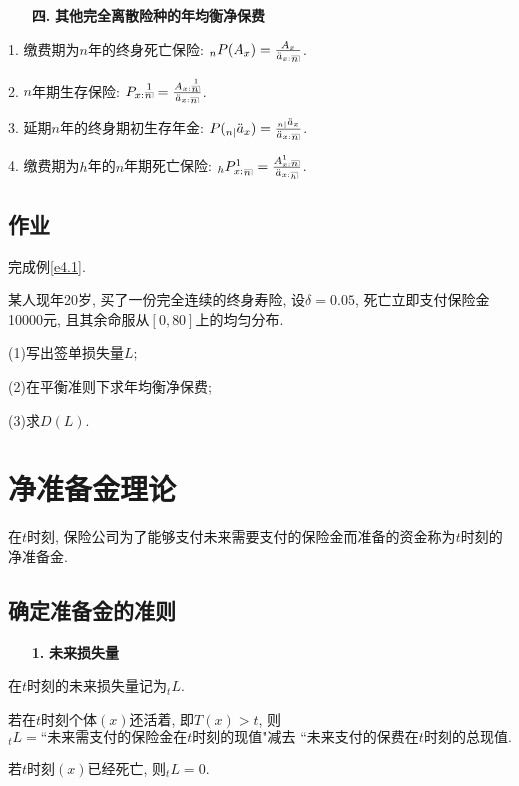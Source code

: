 \documentclass[a4paper,openany, 10pt]{ctexbook}
\makeatletter
\newcommand{\hei}{\CJKfamily{hei}}      %
\DeclareRobustCommand{\annu}[1]{_{%
    \def\arraystretch{0}%
    \setlength\arraycolsep{1pt}%
    \setlength\arrayrulewidth{.2pt}%
    \begin{array}[b]{@{}c|}\hline
        \\[\arraycolsep]%
        \scriptstyle #1%
    \end{array}%
}}
\makeatother
\begin{document}
\begin{itemize}
    \item[{\bf\hei 四.}]{\bf\hei 其他完全离散险种的年均衡净保费}
\end{itemize}

1. 缴费期为$n$年的终身死亡保险:
${}_{n}P(A_{x})=\frac{A_{x}}{\ddot{a}_{x:}{}\annu n}$.

2. $n$年期生存保险:
$P_{x:}\overset{1}{{}\annu n}=\frac{A_{x:}\overset{1}{{}\annu n}}{\ddot a_{x:}{}\annu n}$.

3. 延期$n$年的终身期初生存年金:
$P({}_{n|}\ddot a_{x})=\frac{{}_{n|}\ddot a_{x}}{\ddot{a}_{x:}{}\annu n}$.

4. 缴费期为$h$年的$n$年期死亡保险:
${}_{h}P^{1}_{x:}{}_{\annu n}=\frac{A^{1}_{x:}{}\annu n}{\ddot a_{x:}{}{\scriptsize \annu h}}$.

\section{作业}
\begin{exs}
    完成例\ref{e4.1}.
\end{exs}
\begin{exs}
   某人现年20岁, 买了一份完全连续的终身寿险, 设$\delta=0.05$, 死亡立即支付保险金10000元, 且其余命服从$[0,80]$上的均匀分布.

   (1)写出签单损失量$L;$

   (2)在平衡准则下求年均衡净保费;

   (3)求$D(L).$
\end{exs}
\chapter{净准备金理论}

在$t$时刻, 保险公司为了能够支付未来需要支付的保险金而准备的资金称为$t$时刻的净准备金.
\section{确定准备金的准则}
\begin{itemize}
    \item[{\bf\hei 1.}]{\bf\hei 未来损失量}
\end{itemize}

在$t$时刻的未来损失量记为$_tL$.

 若在$t$时刻个体$(x)$还活着, 即$T(x)>t$, 则$${}_tL=\text{``未来需支付的保险金在$t$时刻的现值"减去 ``未来支付的保费在}t\text{时刻的总现值.}$$

若$t$时刻$(x)$已经死亡, 则${}_tL=0.$
\end{document}
